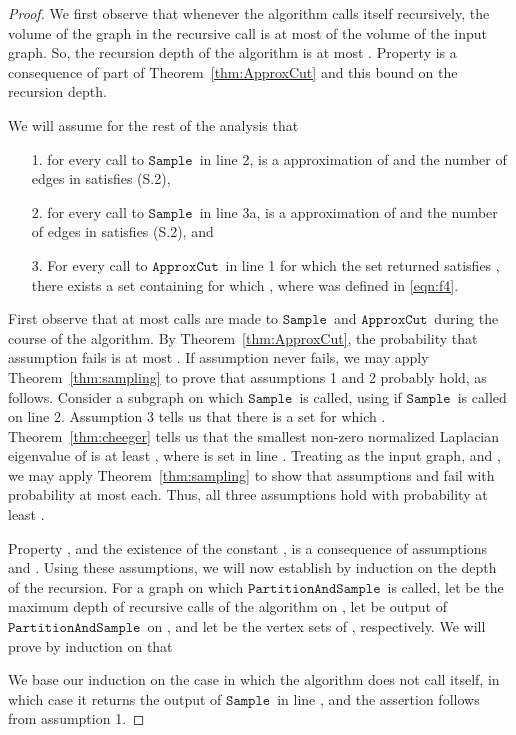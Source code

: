 \documentclass[11pt]{article}
\newcommand{\sample}{\ensuremath{\mathtt{Sample}}}
\newcommand{\approxcut}{\ensuremath{\mathtt{ApproxCut}}}
\newcommand{\partsample}{\ensuremath{\mathtt{PartitionAndSample}}}
\begin{document}
\begin{proof}
We first observe that whenever the algorithm calls itself recursively, the volume
  of the graph in the recursive call is at most  of the volume of the
  input graph.
So, the recursion depth of the algorithm is at most .
Property  is a consequence of part  of Theorem~\ref{thm:ApproxCut}
  and this bound on the recursion depth.


We will assume for the rest of the analysis that
\begin{enumerate}
\item [1.] for every call to \sample \ in line 2,
   is a  approximation of  and the number
  of edges in  satisfies (S.2),

\item [2.] for every call to \sample \ in line 3a,
   is a
   approximation of   and the number
  of edges in  satisfies (S.2), and
\item [3.] For every call to \approxcut \ in line 1
  for which the set  returned satisfies ,
  there exists a set  containing  for which ,
  where  was defined in \eqref{eqn:f4}.
\end{enumerate}
First observe that at most  calls are made to \sample \ and \approxcut \
  during the course of the algorithm.
By Theorem~\ref{thm:ApproxCut}, the probability that assumption  fails is at
  most .
If assumption  never fails, 
  we may apply Theorem~\ref{thm:sampling} to prove that assumptions 1 and 2
  probably hold, as follows.
Consider a subgraph  on which \sample \ is called, using 
  if \sample \ is called on line 2.
Assumption 3 tells us that there is a set 
  for which .
Theorem~\ref{thm:cheeger} tells us that
  the smallest non-zero normalized Laplacian eigenvalue of  is at least
  , where  is set in line .
Treating  as the input graph, and , 
  we may apply Theorem~\ref{thm:sampling} to show that
  assumptions  and  fail with probability at most  each.
Thus, all three assumptions hold with probability at least .

Property , and the existence of the constant ,
   is a consequence of assumptions  and .
Using these assumptions, we will now establish  by induction on
  the depth of the recursion.
For a graph  on which \partsample \ is called, let  be the maximum
  depth of recursive calls of the algorithm on , let
  be output of \partsample \ on ,
  and let  be the vertex sets of
  , respectively.
We will prove by induction on  that




We base our induction on the case in which the algorithm does not call itself,
  in which case it returns
the output of \sample \ in line , and
  the assertion follows from
assumption 1.


\end{proof}
\end{document}
